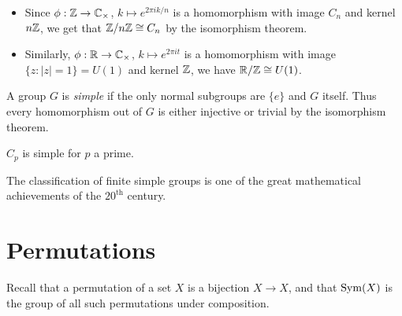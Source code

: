 \documentclass{../../template/note}
\begin{document}
    \begin{example}
        \begin{itemize}
            \item Since \(\phi: \mathbb Z \to \mathbb C_\times\), \(k \mapsto e^{2\pi i k/n}\) is a homomorphism with image \(C_n\) and kernel \(n \mathbb Z\), we get that \(\mathbb Z/n\mathbb Z \cong C_n\) by the isomorphism theorem.
            \item Similarly, \(\phi: \mathbb R \to \mathbb C_\times\), \(k \mapsto e^{2\pi i t}\) is a homomorphism with image \(\{z: |z| = 1\} = U(1)\) and kernel \(\mathbb Z\), we have \(\mathbb R/\mathbb Z \cong U(1)\).
        \end{itemize}
    \end{example}

    
    \begin{definition}
        A group \(G\) is \emph{simple} if the only normal subgroups are \(\{e\}\) and \(G\) itself. Thus every homomorphism out of \(G\) is either injective or trivial by the isomorphism theorem.
    \end{definition}
    
    \begin{example}
        \(C_p\) is simple for \(p\) a prime.
    \end{example}
    
    \begin{remark*}
        The classification of finite simple groups is one of the great mathematical achievements of the \(20^\text{th}\) century.
    \end{remark*}
    
    \section{Permutations}

    Recall that a permutation of a set \(X\) is a bijection \(X \to X\), and that \(\operatorname{Sym}(X)\) is the group of all such permutations under composition.
\end{document}
